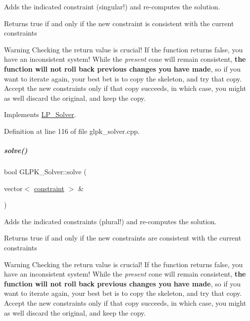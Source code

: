 Adds the indicated constraint (singular!) and re-\/computes the solution. 

\begin{DoxyReturn}{Returns}
{\ttfamily true} if and only if the new constraint is consistent with the current constraints
\end{DoxyReturn}
\begin{DoxyWarning}{Warning}
Checking the return value is crucial! If the function returns {\ttfamily false}, you have an inconsistent system! While the {\itshape present} cone will remain consistent, {\bfseries the function will not roll back previous changes you have made}, so if you want to iterate again, your best bet is to copy the skeleton, and try that copy. Accept the new constraints only if that copy succeeds, in which case, you might as well discard the original, and keep the copy. 
\end{DoxyWarning}


Implements \hyperlink{group___c_l_s_solvers_abd84374c52124116becc8924dc74e12d}{L\+P\+\_\+\+Solver}.



Definition at line 116 of file glpk\+\_\+solver.\+cpp.

\mbox{\label{group___c_l_s_solvers_a6d800f0ec270c782e3cf855aa7f59f4c}} 
\subparagraph{\texorpdfstring{solve()}{solve()}\hspace{0.1cm}{\footnotesize\ttfamily [2/2]}}
{\footnotesize\ttfamily bool G\+L\+P\+K\+\_\+\+Solver\+::solve (\begin{DoxyParamCaption}\item[{vector$<$ \hyperlink{group___c_l_s_solvers_classconstraint}{constraint} $>$ \&}]{ }\end{DoxyParamCaption})\hspace{0.3cm}{\ttfamily [virtual]}}



Adds the indicated constraints (plural!) and re-\/computes the solution. 

\begin{DoxyReturn}{Returns}
{\ttfamily true} if and only if the new constraints are consistent with the current constraints
\end{DoxyReturn}
\begin{DoxyWarning}{Warning}
Checking the return value is crucial! If the function returns {\ttfamily false}, you have an inconsistent system! While the {\itshape present} cone will remain consistent, {\bfseries the function will not roll back previous changes you have made}, so if you want to iterate again, your best bet is to copy the skeleton, and try that copy. Accept the new constraints only if that copy succeeds, in which case, you might as well discard the original, and keep the copy. 
\end{DoxyWarning}


